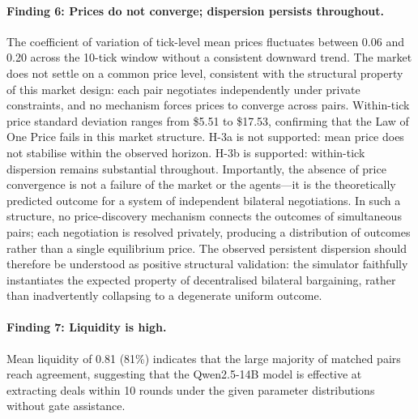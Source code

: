 \paragraph{Finding 6: Prices do not converge; dispersion persists throughout.}
The coefficient of variation of tick-level mean prices fluctuates between 0.06 and 0.20 across the 10-tick window without a consistent downward trend.  The market does not settle on a common price level, consistent with the structural property of this market design: each pair negotiates independently under private constraints, and no mechanism forces prices to converge across pairs.  Within-tick price standard deviation ranges from \$5.51 to \$17.53, confirming that the Law of One Price fails in this market structure.  H-3a is not supported: mean price does not stabilise within the observed horizon.  H-3b is supported: within-tick dispersion remains substantial throughout.  Importantly, the absence of price convergence is not a failure of the market or the agents---it is the theoretically predicted outcome for a system of independent bilateral negotiations.  In such a structure, no price-discovery mechanism connects the outcomes of simultaneous pairs; each negotiation is resolved privately, producing a distribution of outcomes rather than a single equilibrium price.  The observed persistent dispersion should therefore be understood as positive structural validation: the simulator faithfully instantiates the expected property of decentralised bilateral bargaining, rather than inadvertently collapsing to a degenerate uniform outcome.

\paragraph{Finding 7: Liquidity is high.}
Mean liquidity of 0.81 (81\%) indicates that the large majority of matched pairs reach agreement, suggesting that the Qwen2.5-14B model is effective at extracting deals within 10 rounds under the given parameter distributions without gate assistance.

